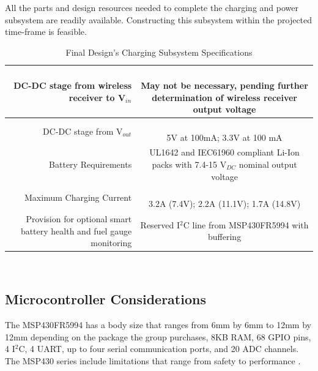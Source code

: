 \documentclass[12pt]{article}
\begin{document}
\indent
All the parts and design resources needed to complete the charging and power subsystem are readily available. Constructing this subsystem within the projected time-frame is feasible.

\begin{table}[h!]
\centering
\caption{Final Design's Charging Subsystem  Specifications}
\begin{tabular} {| r | c | }
\hline
\parbox{0.3\linewidth}{\raggedleft DC-DC stage from wireless receiver to V$_{in}$} &   \parbox{0.65\linewidth}{\hfill \\
May not be necessary, pending further determination of wireless receiver output voltage}\\
\hline
\parbox{0.3\linewidth}{\raggedleft DC-DC stage from V$_{out}$} &   \parbox{0.65\linewidth}{\hfill \\
5V at 100mA; 3.3V at 100 mA}\\
\hline
\parbox{0.3\linewidth}{\raggedleft Battery Requirements} &   \parbox{0.65\linewidth}{\hfill \\
UL1642 and IEC61960 compliant Li-Ion packs with 7.4-15 V$_{DC}$ nominal output voltage}\\
\hline
\parbox{0.3\linewidth}{\raggedleft \vspace{0.4em} Maximum Charging Current} &   \parbox{0.65\linewidth}{\hfill \\
3.2A (7.4V); 2.2A (11.1V); 1.7A (14.8V)}\\
\hline
\parbox{0.3\linewidth}{\raggedleft \vspace{0.4em} Provision for optional smart battery health and fuel gauge monitoring} &   \parbox{0.65\linewidth}{\hfill \\
Reserved I$^2$C line from MSP430FR5994 with buffering}\\
\hline
\end{tabular}
\end{table}
\hfill \\

\subsection{Microcontroller Considerations}

\indent \indent
The MSP430FR5994 has a body size that ranges from 6mm by 6mm to 12mm by 12mm depending on the package the group purchases, 8KB RAM, 68 GPIO pins, 4 I$^2$C, 4 UART, up to four serial communication ports, and 20 ADC channels. The MSP430 series include limitations that range from safety to performance \cite{MSP430FR599x}.\\
\end{document}
